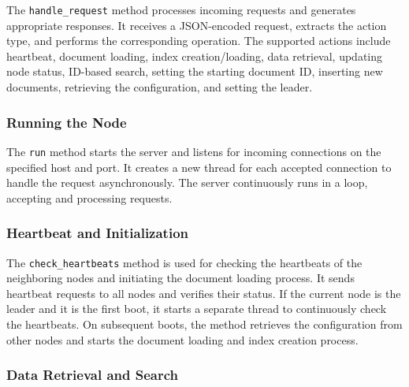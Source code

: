 \documentclass{article}
\begin{document}
The \texttt{handle\_request} method processes incoming requests and generates appropriate 
responses. It receives a JSON-encoded request, extracts the action type, and performs the 
corresponding operation. The supported actions include heartbeat, document loading, index 
creation/loading, data retrieval, updating node status, ID-based search, setting the starting 
document ID, inserting new documents, retrieving the configuration, and setting the leader.

\subsubsection*{Running the Node}

The \texttt{run} method starts the server and listens for incoming connections on the specified 
host and port. It creates a new thread for each accepted connection to handle the request 
asynchronously. The server continuously runs in a loop, accepting and processing requests.


\subsubsection*{Heartbeat and Initialization}

The \texttt{check\_heartbeats} method is used for checking the heartbeats of the neighboring 
nodes and initiating the document loading process. It sends heartbeat requests to all nodes and 
verifies their status. If the current node is the leader and it is the first boot, it starts a 
separate thread to continuously check the heartbeats. On subsequent boots, the method retrieves 
the configuration from other nodes and starts the document loading and index creation process.




\subsubsection*{Data Retrieval and Search}
\end{document}
